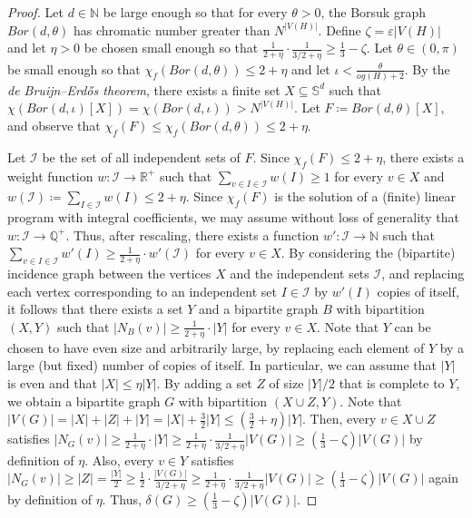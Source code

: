 \documentclass{article}
\begin{document}
\begin{proof}
    Let $d \in \mathbb{N}$ be large enough so that for every $\theta > 0$, the Borsuk graph $Bor(d, \theta)$ has chromatic number greater than $N^{|V(H)|}$.
    Define $\zeta = \varepsilon|V(H)|$ and let $\eta>0$ be chosen small enough so that $\frac{1}{2+\eta}\cdot \frac{1}{3/2 + \eta} \geq \frac{1}{3} - \zeta$.
    Let $\theta \in (0, \pi)$ be small enough so that $\chi_f(Bor(d, \theta)) \leq 2 + \eta$ and let $\iota < \frac{\theta}{og(H)+2}$.
    By the \emph{de Bruijn--Erd\H{o}s theorem}, there exists a finite set $X \subseteq \mathbb{S}^d$ such that $\chi(Bor(d, \iota)[X]) = \chi(Bor(d, \iota)) > N^{|V(H)|}$.
    Let $F \coloneqq Bor(d, \theta)[X]$, and observe that $\chi_f(F) \leq \chi_f(Bor(d, \theta)) \leq 2 + \eta$.

    Let $\mathcal{I}$ be the set of all independent sets of $F$.
    Since $\chi_f(F) \leq 2 + \eta$, there exists a weight function $w : \mathcal{I} \to \mathbb{R}^+$ such that $\sum_{v \in I \in \mathcal{I}}w(I) \geq 1$ for every $v \in X$ and $w(\mathcal{I}) \coloneqq \sum_{I \in \mathcal{I}}w(I) \leq 2+\eta$.
    Since $\chi_f(F)$ is the solution of a (finite) linear program with integral coefficients, we may assume without loss of generality that $w : \mathcal{I} \to \mathbb{Q}^+$.
    Thus, after rescaling, there exists a function $w' : \mathcal{I} \to \mathbb{N}$ such that $\sum_{v \in I \in \mathcal{I}}w'(I) \geq \frac{1}{2+\eta} \cdot w'(\mathcal{I})$ for every $v \in X$.
    By considering the (bipartite) incidence graph between the vertices $X$ and the independent sets $\mathcal{I}$, and replacing each vertex corresponding to an independent set $I \in \mathcal{I}$ by $w'(I)$ copies of itself, it follows that there exists a set $Y$ and a bipartite graph $B$ with bipartition $(X, Y)$ such that $|N_B(v)| \geq \frac{1}{2+\eta} \cdot |Y|$ for every $v \in X$.
    Note that $Y$ can be chosen to have even size and arbitrarily large, by replacing each element of $Y$ by a large (but fixed) number of copies of itself.
    In particular, we can assume that $|Y|$ is even and that $|X| \leq \eta|Y|$.
    By adding a set $Z$ of size $|Y|/2$ that is complete to $Y$, we obtain a bipartite graph $G$ with bipartition $(X \cup Z, Y)$.
    Note that $|V(G)| = |X| + |Z| + |Y| = |X| + \frac{3}{2}|Y| \leq \left(\frac{3}{2} + \eta\right)|Y|$.
    Then, every $v \in X \cup Z$ satisfies $|N_{G}(v)| \geq \frac{1}{2+\eta} \cdot |Y| \geq \frac{1}{2 + \eta} \cdot \frac{1}{3/2 + \eta}|V(G)| \geq  \left(\frac{1}{3} - \zeta\right)|V(G)|$ by definition of $\eta$.
    Also, every $v \in Y$ satisfies $|N_{G}(v)| \geq |Z| = \frac{|Y|}{2} \geq \frac{1}{2} \cdot \frac{|V(G)|}{3/2 + \eta} \geq \frac{1}{2 + \eta} \cdot \frac{1}{3/2 + \eta}|V(G)| \geq \left(\frac{1}{3} - \zeta\right)|V(G)|$ again by definition of $\eta$.
    Thus, $\delta(G) \geq \left(\frac{1}{3} - \zeta\right)|V(G)|$.


\end{proof}
\end{document}
